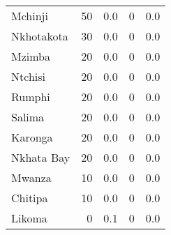 \begin{tabular}{lrrrr}
Mchinji    &             50 &                 0.0 &              0 &                 0.0 \\
Nkhotakota &             30 &                 0.0 &              0 &                 0.0 \\
Mzimba     &             20 &                 0.0 &              0 &                 0.0 \\
Ntchisi    &             20 &                 0.0 &              0 &                 0.0 \\
Rumphi     &             20 &                 0.0 &              0 &                 0.0 \\
Salima     &             20 &                 0.0 &              0 &                 0.0 \\
Karonga    &             20 &                 0.0 &              0 &                 0.0 \\
Nkhata Bay &             20 &                 0.0 &              0 &                 0.0 \\
Mwanza     &             10 &                 0.0 &              0 &                 0.0 \\
Chitipa    &             10 &                 0.0 &              0 &                 0.0 \\
Likoma     &              0 &                 0.1 &              0 &                 0.0 \\
\bottomrule
\end{tabular}
